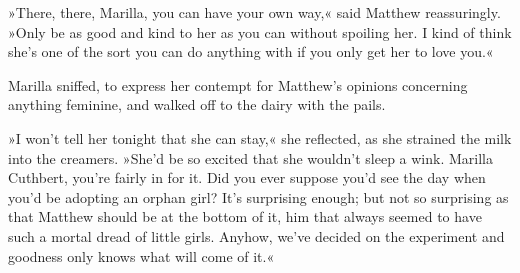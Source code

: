 »There, there, Marilla, you can have your own way,« said Matthew reassuringly. »Only be as good and kind to her as you can without spoiling her. I kind of think she's one of the sort you can do anything with if you only get her to love you.«

Marilla sniffed, to express her contempt for Matthew's opinions concerning anything feminine, and walked off to the dairy with the pails.

»I won't tell her tonight that she can stay,« she reflected, as she strained the milk into the creamers. »She'd be so excited that she wouldn't sleep a wink. Marilla Cuthbert, you're fairly in for it. Did you ever suppose you'd see the day when you'd be adopting an orphan girl? It's surprising enough; but not so surprising as that Matthew should be at the bottom of it, him that always seemed to have such a mortal dread of little girls. Anyhow, we've decided on the experiment and goodness only knows what will come of it.«